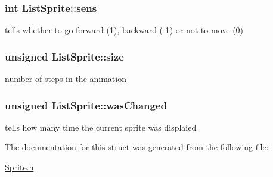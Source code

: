 \subsubsection[{\texorpdfstring{sens}{sens}}]{\setlength{\rightskip}{0pt plus 5cm}int List\+Sprite\+::sens}\hypertarget{structListSprite_a2f28d2c699f6cf22ff8ebfed1d71fc75}{}\label{structListSprite_a2f28d2c699f6cf22ff8ebfed1d71fc75}
tells whether to go forward (1), backward (-\/1) or not to move (0) 
\subsubsection[{\texorpdfstring{size}{size}}]{\setlength{\rightskip}{0pt plus 5cm}unsigned List\+Sprite\+::size}\hypertarget{structListSprite_a6dd83abf2a154c0a4cc8887d7ffc20e3}{}\label{structListSprite_a6dd83abf2a154c0a4cc8887d7ffc20e3}
number of steps in the animation 
\subsubsection[{\texorpdfstring{was\+Changed}{wasChanged}}]{\setlength{\rightskip}{0pt plus 5cm}unsigned List\+Sprite\+::was\+Changed}\hypertarget{structListSprite_acb741e12837c8bf6499506f30ca46477}{}\label{structListSprite_acb741e12837c8bf6499506f30ca46477}
tells how many time the current sprite was displaied 

The documentation for this struct was generated from the following file\+:\begin{DoxyCompactItemize}
\item 
\hyperlink{Sprite_8h}{Sprite.\+h}\end{DoxyCompactItemize}
